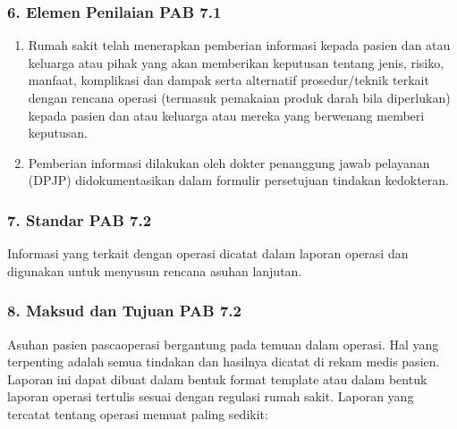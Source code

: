 \documentclass[
]{book}
\providecommand{\tightlist}{%
  \setlength{\itemsep}{0pt}\setlength{\parskip}{0pt}}
\begin{document}
\hypertarget{elemen-penilaian-pab-7.1}{%
\subsubsection*{6. Elemen Penilaian PAB 7.1}\label{elemen-penilaian-pab-7.1}}

\begin{enumerate}
\def\labelenumi{\alph{enumi}.}
\tightlist
\item
  Rumah sakit telah menerapkan pemberian informasi kepada pasien dan atau keluarga atau pihak yang akan memberikan keputusan tentang jenis, risiko, manfaat, komplikasi dan dampak serta alternatif prosedur/teknik terkait dengan rencana operasi (termasuk pemakaian produk darah bila diperlukan) kepada pasien dan atau keluarga atau mereka yang berwenang memberi keputusan.
\item
  Pemberian informasi dilakukan oleh dokter penanggung jawab pelayanan (DPJP) didokumentasikan dalam formulir persetujuan tindakan kedokteran.
\end{enumerate}

\hypertarget{standar-pab-7.2}{%
\subsubsection*{7. Standar PAB 7.2}\label{standar-pab-7.2}}

Informasi yang terkait dengan operasi dicatat dalam laporan operasi dan digunakan untuk menyusun rencana asuhan lanjutan.

\hypertarget{maksud-dan-tujuan-pab-7.2}{%
\subsubsection*{8. Maksud dan Tujuan PAB 7.2}\label{maksud-dan-tujuan-pab-7.2}}

Asuhan pasien pascaoperasi bergantung pada temuan dalam operasi. Hal yang terpenting adalah semua tindakan dan hasilnya dicatat di rekam medis pasien. Laporan ini dapat dibuat dalam bentuk format template atau dalam bentuk laporan operasi tertulis sesuai dengan regulasi rumah sakit. Laporan yang tercatat tentang operasi memuat paling sedikit:
\end{document}

